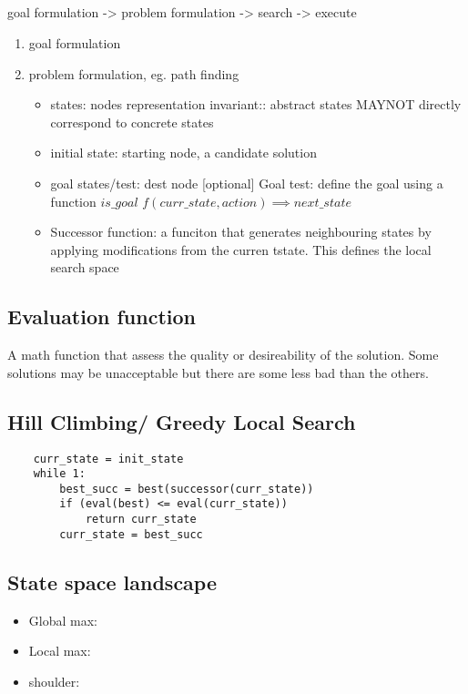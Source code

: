 \documentclass{article}
\begin{document}
\subsection{}
goal formulation -> problem formulation -> search -> execute \newline
\begin{enumerate}
    \item goal formulation
    \item problem formulation, eg. path finding 
        \begin{itemize}
            \item states: nodes representation invariant:: abstract states MAYNOT directly correspond to concrete states
            \item initial state: starting node, a candidate solution
            \item goal states/test: dest node [optional]\newline
                Goal test: define the goal using a function $is\_goal $
                $f(curr\_state, action) \implies next\_state $
            \item Successor function: a funciton that generates neighbouring states by applying modifications from the curren tstate. This defines the local search space 
            
        \end{itemize}
\end{enumerate}
\subsection{Evaluation function}
A math function that assess the quality or desireability of the solution. \newline
Some solutions may be unacceptable but there are some less bad than the others. 
\subsection{Hill Climbing/ Greedy Local Search}
\begin{lstlisting}
    curr_state = init_state
    while 1:
        best_succ = best(successor(curr_state))
        if (eval(best) <= eval(curr_state))
            return curr_state
        curr_state = best_succ
\end{lstlisting}

\subsection{State space landscape}
\begin{itemize}
    \item Global max: 
    \item Local max:
    \item shoulder: 
\end{itemize}
\end{document}
